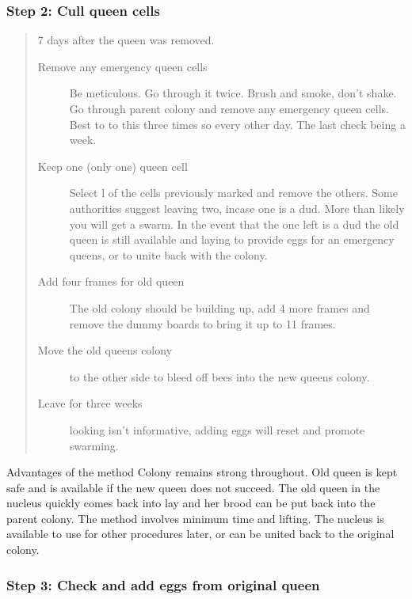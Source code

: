 \subsubsection*{Step 2: Cull queen cells}

\begin{quotation}
7 days after the queen was removed.
\begin{description}
  \item[Remove any emergency queen cells] Be meticulous.  Go through it twice.  Brush and smoke, don't shake.
	Go through parent colony and remove any emergency queen cells.  Best to to this three times so every other day.  The last check being a week.
  \item[Keep one (only one) queen cell]
	Select l of the cells previously marked and remove the others.
	Some authorities suggest leaving two, incase one is a dud.
	More than likely you will get a swarm.
	In the event that the one left is a dud the old queen is still available and laying to provide eggs for an emergency queens,
	or to unite back with the colony.
  \item[Add four frames for old queen] The old colony should be building up, add 4 more frames and remove the dummy boards to bring it up to 11 frames.
  \item[Move the old queens colony] to the other side to bleed off bees into the new queens colony.
  \item[Leave for three weeks] looking isn't informative, adding eggs will reset and promote swarming.

\end{description}
\end{quotation}

Advantages of the method
Colony remains strong throughout.
Old queen is kept safe and is available if the new queen does not succeed.
The old queen in the nucleus quickly comes back into lay and her brood can be put back into the parent colony.
The method involves minimum time and lifting.
The nucleus is available to use for other procedures later, or can be united back to the original colony.

\subsubsection*{Step 3: Check and add eggs from original queen}

